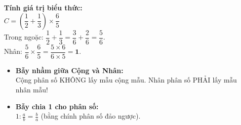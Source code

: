 \documentclass[14pt,a4paper,oneside]{extbook}
\begin{document}
\vspace{-2.5mm}
\noindent
\begin{minipage}[t]{0.49\textwidth}\vspace{0pt}
\begin{tcolorbox}[
  enhanced,
  colback=green!4!white,
  colframe=green!60!black,
  arc=2mm, boxrule=0.8pt,
  left=2mm, right=2mm, top=1.8mm, bottom=1.8mm,
  title={\footnotesize\bfseries\color{white}\faCheckCircle\ Ví dụ thực hành chuẩn mực}
]
{\footnotesize
\textbf{Tính giá trị biểu thức:}\\
$C = \left(\dfrac{1}{2} + \dfrac{1}{3}\right) \times \dfrac{6}{5}$\\
Trong ngoặc: $\dfrac{1}{2} + \dfrac{1}{3} = \dfrac{3}{6} + \dfrac{2}{6} = \dfrac{5}{6}$.\\
Nhân: $\dfrac{5}{6} \times \dfrac{6}{5} = \dfrac{5 \times 6}{6 \times 5} = \mathbf{1}$.
}
\end{tcolorbox}
\end{minipage}
\hfill
\begin{minipage}[t]{0.49\textwidth}\vspace{0pt}
\begin{tcolorbox}[
  enhanced,
  colback=red!4!white,
  colframe=red!70!black,
  arc=2mm, boxrule=0.8pt,
  left=2mm, right=2mm, top=1.8mm, bottom=1.8mm,
  title={\footnotesize\bfseries\color{white}\faExclamationTriangle\ Mẹo tránh bẫy trắc nghiệm}
]
{\footnotesize
\begin{itemize}\setlength{\itemsep}{1.5pt}\setlength{\leftskip}{-2.5mm}
  \item \textbf{Bẫy nhầm giữa Cộng và Nhân:}\\
  Cộng phân số KHÔNG lấy mẫu cộng mẫu. Nhân phân số PHẢI lấy mẫu nhân mẫu!
  \item \textbf{Bẫy chia 1 cho phân số:}\\
  $1 : \frac{a}{b} = \frac{b}{a}$ (bằng chính phân số đảo ngược).
\end{itemize}
}
\end{tcolorbox}
\end{minipage}
\end{document}
